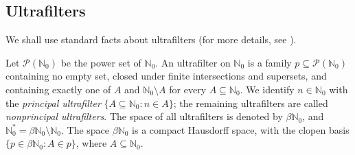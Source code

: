 \documentclass[reqno,12pt]{amsart}
\newcommand{\Nzero}{\mathbb N_0}
\newcommand{\bN}{\beta\Nzero}
\newcommand{\Nstar}{\Nzero^{*}}
\def \N {\mathbb N}
\def \Z {\mathbb Z}
\numberwithin{equation}{section}
\begin{document}
%
%

\subsection{Ultrafilters}
We shall use standard facts about ultrafilters (for more details, see \cite[Chapters~2--4 and 19]{HS}).

Let $\mathcal P(\Nzero)$ be the power set of $\Nzero$.  An ultrafilter on
$\Nzero$ is a family $p\subseteq\mathcal P(\Nzero)$ containing no empty
set, closed under finite intersections and supersets, and containing
exactly one of $A$ and $\Nzero\setminus A$ for every
$A\subseteq\Nzero$.  We identify $n\in\Nzero$ with the \emph{principal
	ultrafilter} $\{A\subseteq\Nzero:n\in A\}$; the remaining ultrafilters are
called \emph{nonprincipal ultrafilters}.  The space of all ultrafilters is denoted by $\bN$,
and
$
\Nstar=\bN\setminus\Nzero.
$
The space $\bN$ is a compact Hausdorff space, with the clopen basis
$\{p\in\bN:A\in p\}$, where $A\subseteq\Nzero$.
\end{document}
